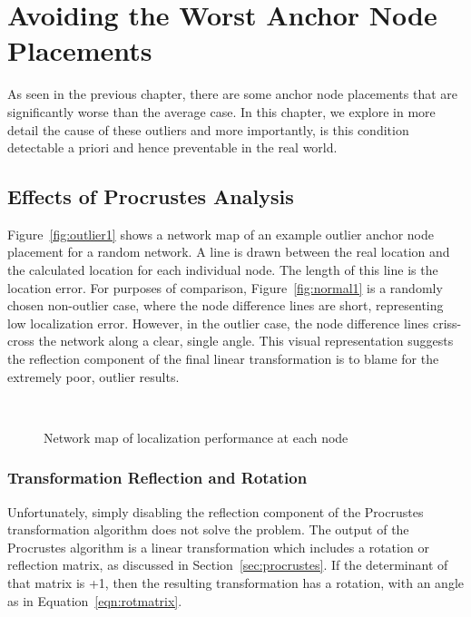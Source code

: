 \chapter{Avoiding the Worst Anchor Node Placements}
\label{chap:outliers}
As seen in the previous chapter, there are some anchor node placements that are significantly worse than the average case.   In this chapter, we explore in more detail the cause of these outliers and more importantly, is this condition detectable a priori and hence preventable in the real world.

\section{Effects of Procrustes Analysis}

Figure~\ref{fig:outlier1} shows a network map of an example outlier anchor node placement for a random network. A line is drawn between the real location and the calculated location for each individual node.  The length of this line is the location error.  For purposes of comparison, Figure~\ref{fig:normal1} is a randomly chosen non-outlier case, where the node difference lines are short, representing low localization error.  However, in the outlier case, the node difference lines criss-cross the network along a clear, single angle.  This visual representation suggests the reflection component of the final linear transformation is to blame for the extremely poor, outlier results.

\begin{figure}
  \centering
\\
	\label{fig:outliernetworkdiff}
	\caption{Network map of localization performance at each node}
\end{figure}

\subsection{Transformation Reflection and Rotation}
\label{sec:reflection}
Unfortunately, simply disabling the reflection component of the Procrustes transformation algorithm does not solve the problem.  The output of the Procrustes algorithm is a linear transformation which includes a rotation or reflection matrix, as discussed in Section~\ref{sec:procrustes}.  If the determinant of that matrix is +1, then the resulting transformation has a rotation, with an angle as in Equation~\ref{eqn:rotmatrix}.  

